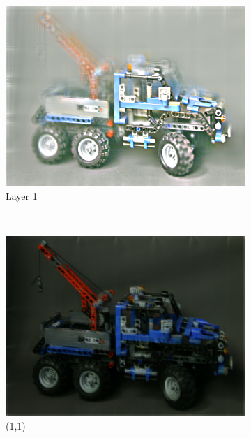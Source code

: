 \documentclass[11pt,a4paper,titlepage]{article}
\begin{document}
\begin{figure}
\begin{subfigure}[t]{0.31\textwidth}
		\includegraphics[width=\textwidth]{results/tiles_legotruck_6x6x480x640_480x640x5_tiling_4x6x200x200_overlap_0.5/5.png}
		\caption{Layer 1}
	\end{subfigure}%
	\\
	\begin{subfigure}[t]{0.31\textwidth}
		\includegraphics[width=\textwidth]{results/tiles_legotruck_6x6x480x640_480x640x5_tiling_4x6x200x200_overlap_0.5/Reconstruction_of_view_(1,1).png}
		\caption{(1,1)}
	\end{subfigure}%
	~
	\begin{subfigure}[t]{0.31\textwidth}

\end{subfigure}
\end{figure}
\end{document}
